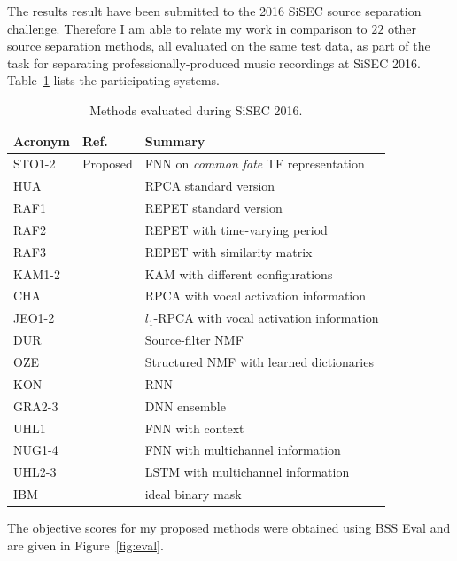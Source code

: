 
The results result have been submitted to the 2016 SiSEC source separation challenge.
Therefore I am able to relate my work in comparison to $22$ other source separation methods, all evaluated on the same test data, as part of the task for separating professionally-produced music recordings at SiSEC 2016.
Table~\ref{tab:sisec_systems} lists the participating systems.
\begin{table}[htbp]
	\centering
	\caption{Methods evaluated during SiSEC 2016.}
	\label{tab:sisec_systems}
	\begin{tabular}{lll@{}}
		\hline
		\textbf{Acronym} & \textbf{Ref.} & \textbf{Summary}\\
		\hline
    STO1-2 & Proposed & FNN on \textit{common fate} TF representation \\
		HUA & \cite{huang12} & RPCA standard version \\
		RAF1 & \cite{rafii13} & REPET standard version \\
		RAF2 & \cite{liutkus12} & REPET with time-varying period \\
		RAF3 & \cite{rafii12} & REPET with similarity matrix \\
		KAM1-2 & \cite{liutkus15} & KAM with different configurations \\
		CHA & \cite{chan15} & RPCA with vocal activation information \\
		JEO1-2 & \cite{jeong17} &  $l_1$-RPCA with vocal activation information \\
		DUR & \cite{durrieu11} & Source-filter NMF \\
		OZE & \cite{salaun14} & Structured NMF with learned dictionaries \\
		KON & \cite{huang15} & RNN \\
		GRA2-3 & \cite{grais16} & DNN ensemble \\
		UHL1 & \cite{uhlich15} & FNN with context \\
		NUG1-4 & \cite{nugraha16} & FNN with multichannel information \\
		UHL2-3 & \cite{uhlich17} & LSTM with multichannel information \\
		IBM & & ideal binary mask \\
	\end{tabular}
\end{table}

The objective scores for my proposed methods were obtained using BSS Eval and are given in Figure~\ref{fig:eval}.

